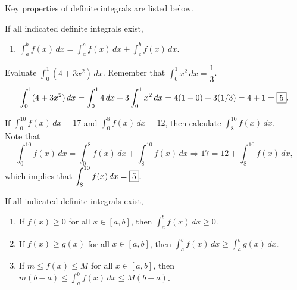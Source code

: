 \documentclass{book}
\newcommand{\dx}{\,dx}
\newcommand{\dint}{\displaystyle \int}
\begin{document}
Key properties of definite integrals are listed below. 

\begin{Prop}\label{prop:defintegralproperties}  If all indicated definite integrals exist,
\begin{enumerate}[!THM!,start=1]
\item$\dint_a^b f(x)\dx = \int_a^c f(x)\dx + \int_c^b f(x)\dx$.
\end{enumerate}
\end{Prop}\vs

\begin{Exam} Evaluate $\dint_0^1 (4+3x^2)\dx$. Remember that $\dint_0^1 x^2\dx = \dfrac{1}{3}$.
\[\int_0^1 (4+3x^2)\dx = \int_0^1 4\dx + 3\int_0^1 x^2\dx = 4(1-0) + 3(1/3) = 4 + 1= \fbox{$5$}. \] 
\end{Exam}\vs

\begin{Exam} If $\dint_0^{10} f(x)\dx = 17$ and $\dint_0^8 f(x)\dx = 12$, then calculate $\dint_8^{10} f(x)\dx$.\\

Note that \[\int_0^{10} f(x)\dx = \int_0^8 f(x)\dx + \int_8^{10}f(x)\dx \Rightarrow 17 = 12 + \int_8^{10}f(x)\dx,\] which implies that $\dint_8^{10}f(x)\dx = \fbox{5}.$
\end{Exam}\vs

\begin{Prop}\label{prop:comparison} If all indicated definite integrals exist,
\begin{enumerate}[!THM!, start=1]
\item If $f(x) \ge 0$ for all $x\in [a,b]$, then $\dint_a^b f(x)\dx \ge 0$.\\

\item\label{item:comparison:b} If $f(x) \ge g(x)$ for all $x\in [a,b]$, then $\dint_a^b f(x)\dx \ge \dint_a^b g(x)\dx$.\\ 

\item If $m\le f(x) \le M$ for all $x\in [a,b]$, then $m(b-a) \le \dint_a^b f(x)\dx \le M(b-a)$. 
\end{enumerate}
\end{Prop}\vs
\end{document}
